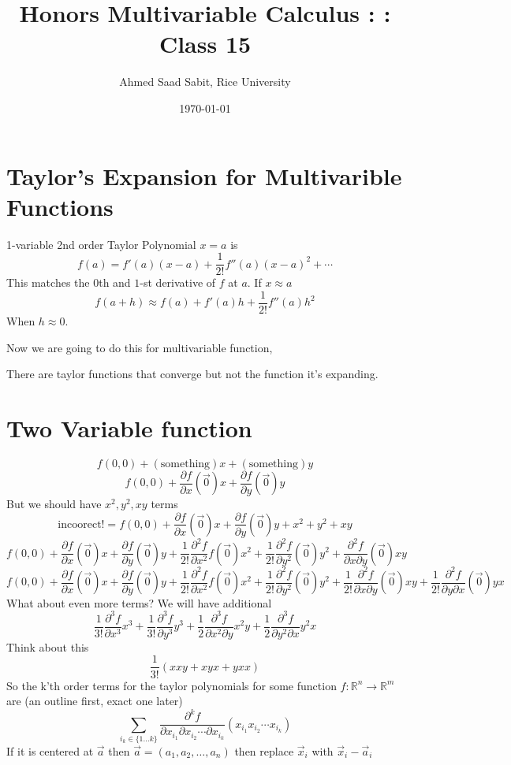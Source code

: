 \documentclass[letter]{article}
\title{Honors Multivariable Calculus : : Class 15}
\author{Ahmed Saad Sabit, Rice University}
\date{\today}
\renewcommand{\frac}{\dfrac}
\begin{document}
\maketitle
\section*{Taylor's Expansion for Multivarible Functions}
1-variable 2nd order Taylor Polynomial $x=a$ is 
\[
f(a) = f'(a) (x-a) + \frac{1}{2!} f''(a) (x-a)^2 + \cdots
\]
This matches the 0th and $ 1$-st derivative of $f$ at $a$. If $x \approx a$ 
\[
f(a+h) \approx f(a) + f'(a) h + \frac{1}{2!} f''(a) h^2
\]
When $h \approx 0$. 

Now we are going to do this for multivariable function,

There are taylor functions that converge but not the function it's expanding. 
\section*{Two Variable function} 
\[
f(0,0) + (\text{something}) x + (\text{something})y 
\]
\[
f(0,0) + \frac{\partial f}{\partial x}(\vec{0}) x + 
\frac{\partial f}{\partial y} (\vec{0}) y 
\] 
But we should have $x^2, y^2, xy$ terms
\[ \text{incoorect!} = 
f(0,0) + \frac{\partial f}{\partial x}(\vec{0}) x + 
\frac{\partial f}{\partial y} (\vec{0}) y +
x^2 
+ 
y^2 
+ 
xy 
\] 
\[ f(0,0) + \frac{\partial f}{\partial x}(\vec{0}) x + 
\frac{\partial f}{\partial y} (\vec{0}) y +
\frac{1}{2! } \frac{\partial^2 f}{\partial x^2} f(\vec{0}) x^2 
+ 
\frac{1}{2!} \frac{\partial^2 f}{\partial y^2 } (\vec{0})y^2 
+ 
\frac{\partial^2 f}{\partial x \partial y} (\vec{0})xy 
\] 
\[ f(0,0) + \frac{\partial f}{\partial x}(\vec{0}) x + 
\frac{\partial f}{\partial y} (\vec{0}) y +
\frac{1}{2! } \frac{\partial^2 f}{\partial x^2} f(\vec{0}) x^2 
+ 
\frac{1}{2!} \frac{\partial^2 f}{\partial y^2 } (\vec{0})y^2 
+ 
\frac{1}{2!}\frac{\partial^2 f}{\partial x \partial y} (\vec{0})xy 
+
\frac{1}{2!}\frac{\partial^2 f}{\partial y \partial x} (\vec{0}) yx
\] 
What about even more terms? We will have additional 
\[
\frac{1}{3!} \frac{\partial^3 f}{\partial x^3} x^3 + 
\frac{1}{3!} \frac{\partial^3 f}{\partial y^3} y^3 + 
\frac{1}{2} \frac{\partial ^3 f}{\partial x^2 \partial y} x^2 y + 
\frac{1}{2} \frac{\partial^3 f}{\partial y^2 \partial x} y^2 x 
\]
Think about this 
\[
\frac{1}{3!} (x x y + xy x + y x x )
\]
So the k'th order terms for the taylor polynomials for some function $f: \mathbb{R}^{n} \to \mathbb{R}^{m}$ are (an outline first, exact one later)
\[
	\sum_{i_k \in  \{1 \ldots k\} }^{} \frac{\partial^{k}f}{\partial x_{i_1} \partial x_{i_2} \cdots \partial x_{i_k} }\left(x_{i_1} x_{i_2} \cdots x_{i_k} \right)
\] 
If it is centered at $\vec{a}$ then $\vec{a} = (a_1, a_2, \ldots, a_n)$ then replace $\vec{x}_i$ with $\vec{x}_i - \vec{a}_i$
\end{document}
